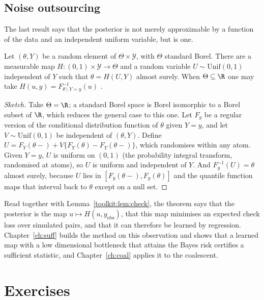 \subsection{Noise outsourcing}\label{toolkit:sec:noise}

The last result says that the posterior is not merely approximable by a function of the data and
an independent uniform variable, but is one.

\begin{theorem}\label{toolkit:thm:noise}
Let $(\theta,Y)$ be a random element of $\Theta\times\mathcal{Y}$, with $\Theta$ standard Borel.
There are a measurable map $H:(0,1)\times\mathcal{Y}\to\Theta$ and a random variable
$U\sim\mathrm{Unif}(0,1)$ independent of $Y$ such that $\theta=H(U,Y)$ almost surely. When
$\Theta\subseteq\R$ one may take $H(u,y)=F^{-1}_{\theta\mid Y=y}(u)$
\citep[Theorem~6.10]{toolkit:kallenberg2002}.
\end{theorem}

\begin{proof}[Sketch]
Take $\Theta=\R$; a standard Borel space is Borel isomorphic to a Borel subset of $\R$, which
reduces the general case to this one. Let $F_y$ be a regular version of the conditional
distribution function of $\theta$ given $Y=y$, and let $V\sim\mathrm{Unif}(0,1)$ be independent of
$(\theta,Y)$. Define $U=F_Y(\theta-)+V\{F_Y(\theta)-F_Y(\theta-)\}$, which randomises within any
atom. Given $Y=y$, $U$ is uniform on $(0,1)$ (the probability integral transform, randomised at
atoms), so $U$ is uniform and independent of $Y$. And $F_y^{-1}(U)=\theta$ almost surely, because
$U$ lies in $[F_y(\theta-),F_y(\theta)]$ and the quantile function maps that interval back to
$\theta$ except on a null set.
\end{proof}

Read together with Lemma~\ref{toolkit:lem:check}, the theorem says that the posterior is the map
$u\mapsto H(u,y_{\mathrm{obs}})$, that this map minimises an expected check loss over simulated
pairs, and that it can therefore be learned by regression. Chapter~\ref{ch:suff} builds the
method on this observation and shows that a learned map with a low dimensional bottleneck that
attains the Bayes risk certifies a sufficient statistic, and Chapter~\ref{ch:coal} applies it to
the coalescent.

\section{Exercises}\label{toolkit:sec:exercises}

